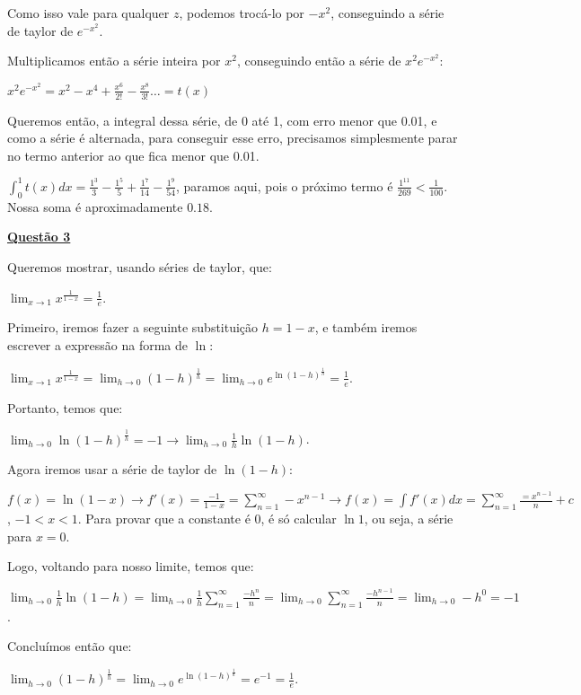 \documentclass[12pt]{article}
\newcommand{\gsum}[3]{\displaystyle\sum_{#1}^#2 #3}
\newcommand{\mytitle}[1]{\textbf{\underline{#1}}}
\begin{document}
Como isso vale para qualquer $z$, podemos trocá-lo por $-x^2$, conseguindo a série de taylor de $e^{-x^2}$.

Multiplicamos então a série inteira por $x^2$, conseguindo então a série de $x^2e^{-x^2}$:

$x^2e^{-x^2} = x^2-x^4+\frac{x^6}{2!}-\frac{x^8}{3!} \dots = t(x)$

Queremos então, a integral dessa série, de 0 até 1, com erro menor que 0.01, e como a série é alternada, para conseguir esse erro, precisamos simplesmente parar no termo anterior ao que fica menor que 0.01.

$\int_0^1 t(x)dx = \frac{1^3}{3} - \frac{1^5}{5} + \frac{1^7}{14} - \frac{1^9}{54}$, paramos aqui, pois o próximo termo é $\frac{1^{11}}{269} < \frac{1}{100}$. Nossa soma é aproximadamente $0.18$.

\mytitle{Questão 3}

Queremos mostrar, usando séries de taylor, que:

$\displaystyle\lim_{x \to 1}x^{\frac{1}{1-x}} = \frac{1}{e}$.

Primeiro, iremos fazer a seguinte substituição $h = 1-x$, e também iremos escrever a expressão na forma de $\ln$:

$\displaystyle\lim_{x \to 1}x^{\frac{1}{1-x}} = \lim_{h \to 0}(1-h)^{\frac{1}{h}} = \lim_{h \to 0}e^{\ln{(1-h)^{\frac{1}{h}}}} = \frac{1}{e}$.

Portanto, temos que:

$\displaystyle\lim_{h \to 0}\ln{(1-h)^{\frac{1}{h}}} = -1 \rightarrow \lim_{h \to 0}\frac{1}{h}\ln(1-h)$.

Agora iremos usar a série de taylor de $\ln{(1-h)}$:

$f(x) = \ln{(1-x)} \rightarrow f'(x) = \frac{-1}{1-x} = \gsum{n=1}{\infty}{-x^{n-1}} \rightarrow f(x) = \int f'(x)dx = \gsum{n=1}{\infty}{\frac{=x^{n-1}}{n}}+c$, $-1<x<1$. Para provar que a constante é 0, é só calcular $\ln{1}$, ou seja, a série para $x = 0$.

Logo, voltando para nosso limite, temos que:

$\displaystyle\lim_{h \to 0}\frac{1}{h}\ln(1-h) = \lim_{h \to 0}\frac{1}{h}\gsum{n=1}{\infty}{\frac{-h^n}{n}} = \lim_{h \to 0}\gsum{n=1}{\infty}{\frac{-h^{n-1}}{n}} = \lim_{h \to 0}-h^0 = -1$.

Concluímos então que:

$\displaystyle\lim_{h \to 0}(1-h)^{\frac{1}{h}} = \lim_{h \to 0}e^{\ln{(1-h)^{\frac{1}{h}}}} = e^{-1} = \frac{1}{e}$.
\end{document}
